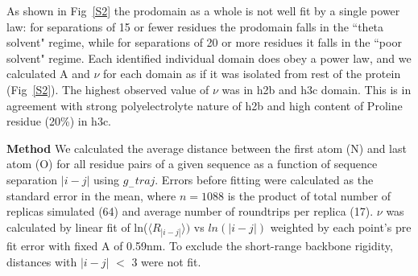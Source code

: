 \documentclass[10pt,letterpaper]{article}
\begin{document}
As shown in Fig~\ref{S2} the prodomain as a whole is not well fit by a single power law: for separations of 15 or fewer residues the prodomain falls in the ``theta solvent" regime, while for separations of 20 or more residues it falls in the ``poor solvent" regime. Each identified individual domain does obey a power law, and we calculated A and $\nu$ for each domain as if it was isolated from rest of the protein (Fig~\ref{S2}). The highest observed value of $\nu$ was in h2b and h3c domain. This is in agreement with strong polyelectrolyte nature of h2b and high content of Proline residue (20\%)  in h3c.



\textbf{Method} We calculated the average distance between the first atom (N) and last atom (O) for all residue pairs of a given sequence as a function of sequence separation $|i-j|$ using $g_{-}traj$. 
Errors before fitting were calculated as the standard error in the mean, where $n =  1088$ is the product of total number of replicas simulated (64) and average number of roundtrips per replica (17).   $\nu$ was calculated by linear fit of ln($\langle R_{|i-j|}\rangle)$ vs $ln(|i-j|)$
weighted by each point's pre fit error with fixed A of 0.59nm. To exclude the short-range backbone rigidity, distances with $|i-j|$ $<$ 3 were not fit.

\end{document}
